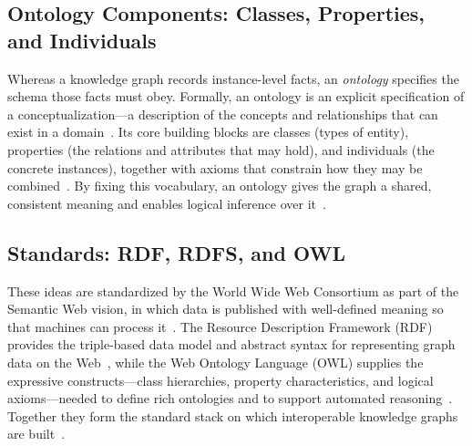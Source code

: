 \subsection{Ontology Components: Classes, Properties, and Individuals}

Whereas a knowledge graph records instance-level facts, an \emph{ontology}
specifies the schema those facts must obey. Formally, an ontology is an explicit
specification of a conceptualization---a description of the concepts and
relationships that can exist in a domain~\cite{gruber1993ontology}. Its core
building blocks are classes (types of entity), properties (the relations and
attributes that may hold), and individuals (the concrete instances), together
with axioms that constrain how they may be combined~\cite{hogan2021kg}. By fixing
this vocabulary, an ontology gives the graph a shared, consistent meaning and
enables logical inference over it~\cite{gruber1993ontology, hogan2021kg}.

\subsection{Standards: RDF, RDFS, and OWL}

These ideas are standardized by the World Wide Web Consortium as part of the
Semantic Web vision, in which data is published with well-defined meaning so that
machines can process it~\cite{bernerslee2001semantic}. The Resource Description
Framework (RDF) provides the triple-based data model and abstract syntax for
representing graph data on the Web~\cite{w3c2014rdf}, while the Web Ontology
Language (OWL) supplies the expressive constructs---class hierarchies, property
characteristics, and logical axioms---needed to define rich ontologies and to
support automated reasoning~\cite{w3c2012owl}. Together they form the standard
stack on which interoperable knowledge graphs are built~\cite{hogan2021kg}.
